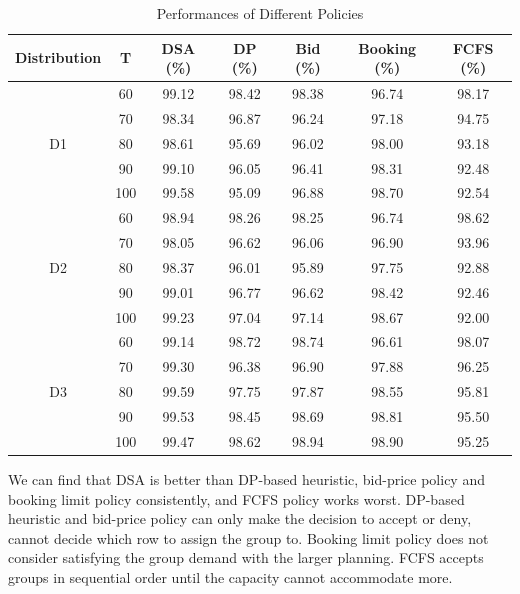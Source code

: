 \begin{table}[ht]
  \centering
  \caption{Performances of Different Policies}
  \begin{tabular}{|c|c|c|c|c|c|c|}
  \hline
  Distribution & T & DSA (\%) & DP (\%) & Bid (\%) & Booking (\%) & FCFS (\%) \\
  \hline
  \multirow{5}{*}{D1} & 60   & 99.12 & 98.42 & 98.38 & 96.74 & 98.17 \\
  & 70    & 98.34 & 96.87 & 96.24 & 97.18 & 94.75 \\
  & 80    & 98.61 & 95.69 & 96.02 & 98.00 & 93.18 \\
  & 90    & 99.10 & 96.05 & 96.41 & 98.31 & 92.48 \\
  & 100   & 99.58 & 95.09 & 96.88 & 98.70 & 92.54 \\
  \hline
  \multirow{5}{*}{D2} & 60   & 98.94 & 98.26 & 98.25 & 96.74 & 98.62 \\
     & 70   & 98.05 & 96.62 & 96.06 & 96.90 & 93.96 \\
     & 80   & 98.37 & 96.01 & 95.89 & 97.75 & 92.88 \\
     & 90   & 99.01 & 96.77 & 96.62 & 98.42 & 92.46 \\
     & 100  & 99.23 & 97.04 & 97.14 & 98.67 & 92.00 \\
  \hline
  \multirow{5}{*}{D3} & 60  &  99.14 & 98.72 & 98.74 & 96.61 & 98.07 \\
     & 70  & 99.30 & 96.38 & 96.90 & 97.88 & 96.25 \\
     & 80  & 99.59 & 97.75 & 97.87 & 98.55 & 95.81 \\
     & 90  & 99.53 & 98.45 & 98.69 & 98.81 & 95.50 \\
     & 100 & 99.47 & 98.62 & 98.94 & 98.90 & 95.25 \\
  \hline
  \end{tabular}
\end{table}

We can find that DSA is better than DP-based heuristic, bid-price policy and booking limit policy consistently, and FCFS policy works worst. DP-based heuristic and bid-price policy can only make the decision to accept or deny, cannot decide which row to assign the group to. Booking limit policy does not consider satisfying the group demand with the larger planning. FCFS accepts groups in sequential order until the capacity cannot accommodate more.

